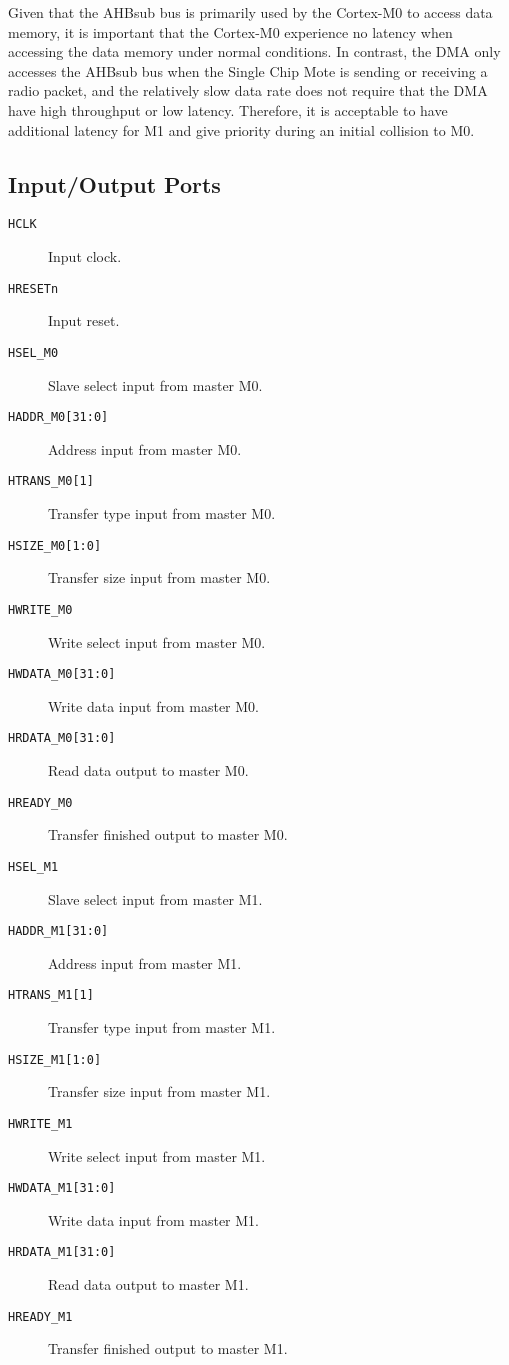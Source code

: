 Given that the AHBsub bus is primarily used by the Cortex-M0 to access data memory, it is important that the Cortex-M0 experience no latency when accessing the data memory under normal conditions. In contrast, the DMA only accesses the AHBsub bus when the Single Chip Mote is sending or receiving a radio packet, and the relatively slow data rate does not require that the DMA have high throughput or low latency. Therefore, it is acceptable to have additional latency for M1 and give priority during an initial collision to M0.

\subsection{Input/Output Ports}
\begin{description}
	\item[\texttt{HCLK}] Input clock.
	\item[\texttt{HRESETn}] Input reset.
	
	\item[\texttt{HSEL\_M0}] Slave select input from master M0.
	\item[\texttt{HADDR\_M0[31:0]}] Address input from master M0.
	\item[\texttt{HTRANS\_M0[1]}] Transfer type input from master M0.
	\item[\texttt{HSIZE\_M0[1:0]}] Transfer size input from master M0.
	\item[\texttt{HWRITE\_M0}] Write select input from master M0.
	\item[\texttt{HWDATA\_M0[31:0]}] Write data input from master M0.
	\item[\texttt{HRDATA\_M0[31:0]}] Read data output to master M0.
	\item[\texttt{HREADY\_M0}] Transfer finished output to master M0.

	\item[\texttt{HSEL\_M1}] Slave select input from master M1.
	\item[\texttt{HADDR\_M1[31:0]}] Address input from master M1.
	\item[\texttt{HTRANS\_M1[1]}] Transfer type input from master M1.
	\item[\texttt{HSIZE\_M1[1:0]}] Transfer size input from master M1.
	\item[\texttt{HWRITE\_M1}] Write select input from master M1.
	\item[\texttt{HWDATA\_M1[31:0]}] Write data input from master M1.
	\item[\texttt{HRDATA\_M1[31:0]}] Read data output to master M1.
	\item[\texttt{HREADY\_M1}] Transfer finished output to master M1.
	

\end{description}
